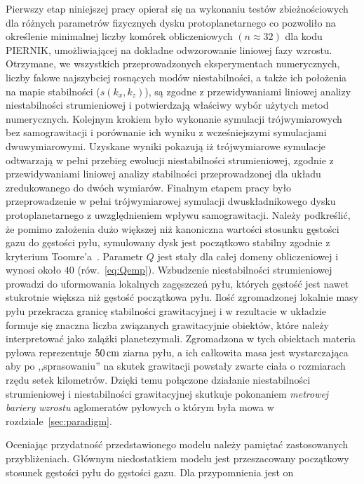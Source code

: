 %
\par Pierwszy etap niniejszej pracy opierał się na wykonaniu testów
zbieżnościowych dla różnych parametrów fizycznych dysku protoplanetarnego co
pozwoliło na określenie minimalnej liczby komórek obliczeniowych $(n\approx32)$
dla kodu \textsc{PIERNIK}, umożliwiającej na dokładne odwzorowanie liniowej fazy
wzrostu.  Otrzymane, we wszystkich przeprowadzonych eksperymentach numerycznych,
liczby falowe najszybciej rosnących modów niestabilności, a także ich położenia na
mapie stabilności ($s(k_x, k_z)$), są zgodne z przewidywaniami liniowej analizy
niestabilności strumieniowej i potwierdzają właściwy wybór użytych metod
numerycznych. Kolejnym krokiem było wykonanie symulacji trójwymiarowych bez
samograwitacji i porównanie ich wyniku z wcześniejszymi symulacjami
dwuwymiarowymi. Uzyskane wyniki pokazują iż trójwymiarowe symulacje odtwarzają w
pełni przebieg ewolucji niestabilności strumieniowej, zgodnie z przewidywaniami
liniowej analizy stabilności przeprowadzonej dla układu zredukowanego do dwóch
wymiarów. Finalnym etapem pracy było przeprowadzenie w pełni trójwymiarowej
symulacji dwuskładnikowego dysku protoplanetarnego z uwzględnieniem wpływu
samograwitacji. Należy podkreślić, że pomimo założenia dużo większej niż
kanoniczna wartości stosunku gęstości gazu do gęstości pyłu, symulowany dysk
jest początkowo stabilny zgodnie z kryterium Toomre'a~.
Parametr $Q$ jest stały dla całej domeny obliczeniowej i wynosi około $40$
(rów.~\ref{eq:Qemp}). Wzbudzenie niestabilności strumieniowej prowadzi do
uformowania lokalnych zagęszczeń pyłu, których gęstość jest nawet stukrotnie
większa niż gęstość początkowa pyłu. Ilość zgromadzonej lokalnie masy pyłu
przekracza granicę stabilności grawitacyjnej i w rezultacie w układzie formuje
się znaczna liczba związanych grawitacyjnie obiektów, które należy interpretować
jako zalążki planetezymali. Zgromadzona w tych obiektach materia
pyłowa reprezentuje $50\hbox{$\thinspace\textrm{cm}$}$ ziarna pyłu, a ich całkowita masa jest
wystarczająca aby po ,,sprasowaniu'' na skutek grawitacji powstały zwarte ciała o
rozmiarach rzędu setek kilometrów. Dzięki temu połączone działanie
niestabilności strumieniowej i niestabilności grawitacyjnej skutkuje pokonaniem
\emph{metrowej bariery wzrostu} aglomeratów pyłowych o którym była mowa w
rozdziale~\ref{sec:paradigm}.
%
\par 
Oceniając przydatność przedstawionego modelu należy pamiętać zastosowanych
przybliżeniach. Głównym niedostatkiem modelu jest przeszacowany
początkowy stosunek gęstości pyłu do gęstości gazu. Dla przypomnienia jest on

